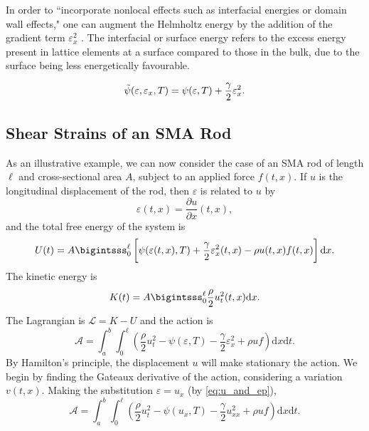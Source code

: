\begin{multicols}{2}
In order to ``incorporate nonlocal effects such as interfacial energies or domain wall effects," one can augment the Helmholtz energy by the addition of the gradient term $\varepsilon_{x}^2$ \cite{smith2005smart}. The interfacial or surface energy refers to the excess energy present in lattice elements at a surface compared to those in the bulk, due to the surface being less energetically favourable.

\begin{equation} \label{eq:augmented_psi}
    \Tilde{\psi}(\varepsilon,\varepsilon_x,T) = \psi(\varepsilon,T) + \frac{\gamma}{2}\varepsilon_{x}^2.
\end{equation} 

\subsection{Shear Strains of an SMA Rod}
As an illustrative example, we can now consider the case of an SMA rod of length $\ell$ and cross-sectional area $A$, subject to an applied force $f(t,x)$. If $u$ is the longitudinal displacement of the rod, then $\varepsilon$ is related to $u$ by
\begin{equation} \label{eq:u_and_ep}
    \varepsilon(t,x) = \frac{\partial u}{\partial x}(t,x),
\end{equation}
and the total free energy of the system is
\begin{equation} \label{eq:U}
    U(t) = A \bigintsss_0^{\ell} \left[\psi(\varepsilon(t,x),T) + \frac{\gamma}{2}\varepsilon_x^2(t,x) - \rho u(t,x) f(t,x) \right]\mathrm{d}x.
\end{equation}
The kinetic energy is
\begin{equation} \label{eq:K}
    K(t) = A \bigintsss_0^{\ell} \frac{\rho}{2}u_t^2(t,x) \mathrm{d}x.
\end{equation}
The Lagrangian is $\mathcal{L} = K - U$ and the action is
\begin{equation} \label{eq:A}
    \mathcal{A} = \int_a^b\int_0^{\ell} \left(\frac{\rho}{2}u_t^2 - \psi(\varepsilon, T) - \frac{\gamma}{2}\varepsilon_x^2 + \rho u f \right) \mathrm{d}x \mathrm{d}t.
\end{equation}
By Hamilton's principle, the displacement $u$ will make stationary the action. We begin by finding the Gateaux derivative of the action, considering a variation $v(t,x)$. Making the substitution $\varepsilon = u_x$ (by \ref{eq:u_and_ep}),
\begin{equation} \label{eq:A_2}
    \mathcal{A} = \int_a^b\int_0^{\ell} \left(\frac{\rho}{2}u_t^2 - \psi(u_x, T) - \frac{\gamma}{2}u_{xx}^2 + \rho u f \right) \mathrm{d}x \mathrm{d}t.

\end{equation}
\end{multicols}
